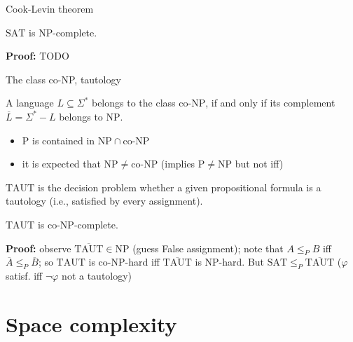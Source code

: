 \documentclass[handout]{beamer}
\begin{document}
  
    
\begin{frame}{Cook-Levin theorem}
    
    \begin{theorem}
        $\mathrm{SAT}$ is $\mathrm{NP}$-complete.
    \end{theorem}

    \textbf{Proof:} TODO
    
\end{frame}


\begin{frame}{The class co-NP, tautology}
    \begin{definition}
     A language $L\subseteq \Sigma^*$ belongs to the class \alert{co-$\mathrm{NP}$}, if and only if its complement $\overline{L}=\Sigma^*-L$ belongs to $\mathrm{NP}$.
    \end{definition}
    \vspace{-12pt}
    \begin{itemize}
        \item $\mathrm{P}$ is contained in $\mathrm{NP}\cap\text{co-}\mathrm{NP}$
        \item it is expected that $\mathrm{NP}\neq\text{co-}\mathrm{NP}$ (implies $\mathrm{P}\neq\mathrm{NP}$ but not iff)
    \end{itemize}

    \begin{example}
        \alert{$\mathrm{TAUT}$} is the decision problem whether a given propositional formula is a tautology (i.e., satisfied by every assignment).
    \end{example}
    \begin{theorem}
        $\mathrm{TAUT}$ is co-$\mathrm{NP}$-complete.
    \end{theorem}
    \textbf{Proof:} observe $\overline{\mathrm{TAUT}}\in\mathrm{NP}$ (guess False assignment); note that $A\leq_P B$ iff $\overline{A}\leq_P\overline{B}$; so $\mathrm{TAUT}$ is co-$\mathrm{NP}$-hard iff $\overline{\mathrm{TAUT}}$ is $\mathrm{NP}$-hard. But $\mathrm{SAT}\leq_P\overline{\mathrm{TAUT}}$ ($\varphi$ satisf. iff $\neg\varphi$ not a tautology)\hfill\qedsymbol
\end{frame}
    

\section*{Space complexity}
\end{document}
